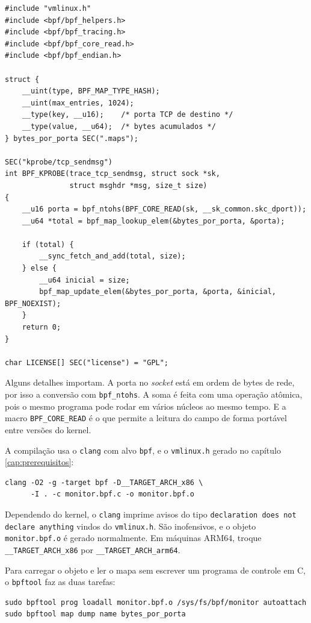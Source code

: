 \begin{lstlisting}
#include "vmlinux.h"
#include <bpf/bpf_helpers.h>
#include <bpf/bpf_tracing.h>
#include <bpf/bpf_core_read.h>
#include <bpf/bpf_endian.h>

struct {
    __uint(type, BPF_MAP_TYPE_HASH);
    __uint(max_entries, 1024);
    __type(key, __u16);    /* porta TCP de destino */
    __type(value, __u64);  /* bytes acumulados */
} bytes_por_porta SEC(".maps");

SEC("kprobe/tcp_sendmsg")
int BPF_KPROBE(trace_tcp_sendmsg, struct sock *sk,
               struct msghdr *msg, size_t size)
{
    __u16 porta = bpf_ntohs(BPF_CORE_READ(sk, __sk_common.skc_dport));
    __u64 *total = bpf_map_lookup_elem(&bytes_por_porta, &porta);

    if (total) {
        __sync_fetch_and_add(total, size);
    } else {
        __u64 inicial = size;
        bpf_map_update_elem(&bytes_por_porta, &porta, &inicial, BPF_NOEXIST);
    }
    return 0;
}

char LICENSE[] SEC("license") = "GPL";
\end{lstlisting}

Alguns detalhes importam. A porta no \textit{socket} está em ordem de bytes de rede, por isso a conversão com \texttt{bpf\_ntohs}. A soma é feita com uma operação atômica, pois o mesmo programa pode rodar em vários núcleos ao mesmo tempo. E a macro \texttt{BPF\_CORE\_READ} é o que permite a leitura do campo de forma portável entre versões do kernel.

A compilação usa o \texttt{clang} com alvo \texttt{bpf}, e o \texttt{vmlinux.h} gerado no capítulo \ref{cap:prerequisitos}:

\begin{lstlisting}
clang -O2 -g -target bpf -D__TARGET_ARCH_x86 \
      -I . -c monitor.bpf.c -o monitor.bpf.o
\end{lstlisting}

Dependendo do kernel, o \texttt{clang} imprime avisos do tipo \texttt{declaration does not declare anything} vindos do \texttt{vmlinux.h}. São inofensivos, e o objeto \texttt{monitor.bpf.o} é gerado normalmente. Em máquinas ARM64, troque \texttt{\_\_TARGET\_ARCH\_x86} por \texttt{\_\_TARGET\_ARCH\_arm64}.

Para carregar o objeto e ler o mapa sem escrever um programa de controle em C, o \texttt{bpftool} faz as duas tarefas:

\begin{lstlisting}
sudo bpftool prog loadall monitor.bpf.o /sys/fs/bpf/monitor autoattach
sudo bpftool map dump name bytes_por_porta
\end{lstlisting}

